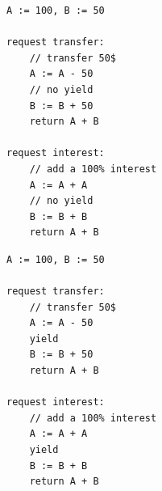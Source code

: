 \noindent
\begin{minipage}[t]{0.45\textwidth}
	\begin{lstlisting}[caption={Serializable},
		label={lst:BankSer},numbers=none]
A := 100, B := 50

request transfer: 
    // transfer 50$
    A := A - 50
    // no yield
    B := B + 50
    return A + B
	
request interest: 
    // add a 100% interest
    A := A + A
    // no yield
    B := B + B
    return A + B      
			\end{lstlisting}
\end{minipage}
\hfill
\begin{minipage}[t]{0.45\textwidth}
	\begin{lstlisting}[caption={Not serializable},
		label={lst:BankNonSer},numbers=none]
A := 100, B := 50
	
request transfer: 
    // transfer 50$
    A := A - 50
    yield
    B := B + 50
    return A + B

request interest: 
    // add a 100% interest
    A := A + A
    yield
    B := B + B
    return A + B
      		\end{lstlisting}
\end{minipage}
	

%




